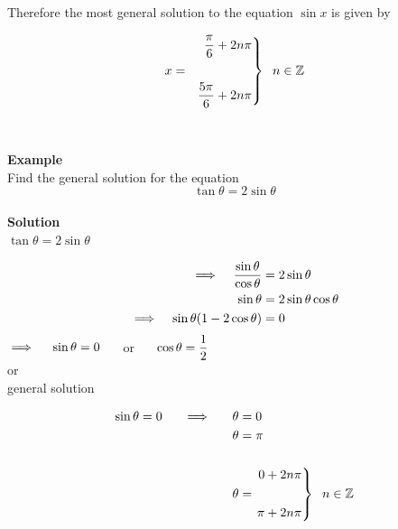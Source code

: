 \documentclass[11pt,a4paper]{article}
\begin{document}
Therefore the most general solution to the equation $\sin x$ is given by
 
$$
x =\hspace{0.2cm} \left.\begin{aligned}
\dfrac{\pi}{6} + 2n\pi\\\\
\dfrac{5\pi}{6} + 2n\pi\\
\end{aligned}
\right\}\hspace{0.2cm} n \in \mathbb{Z}
$$\\\\





\textbf{Example}\\
Find the general solution for the equation $$\tan \theta = 2\sin \theta$$\\

\textbf{Solution}\\

$\tan \theta = 2\sin \theta$

\begin{align*}
\implies\hspace{0.3cm} \dfrac{\sin \theta}{\cos \theta} & = 2\sin \theta\\
\sin \theta & = 2\sin \theta \cos \theta\\
\implies \hspace{0.3cm} \sin \theta ( 1 - 2\cos \theta ) & = 0\
\end{align*}
$\implies\hspace{0.4cm} \sin \theta = 0\hspace{0.5cm}$ or $\hspace{0.5cm} \cos \theta = \dfrac{1}{2}$\\

or\\

general solution

\begin{align*}
\sin \theta = 0 \hspace{0.5cm} \implies \hspace{0.5cm} \theta & = 0\\
\theta & = \pi\\\\
\theta & = \left.\begin{aligned}
0 & + 2n\pi\\\\
\pi & + 2n\pi\\
\end{aligned}
\right\} \hspace{0.2cm} n\in \mathbb{Z}
\end{align*}
\end{document}
